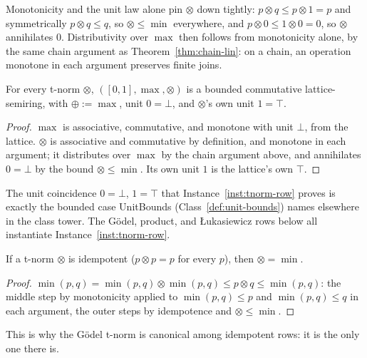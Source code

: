 Monotonicity and the unit law alone pin $\otimes$ down tightly: $p
\otimes q \le p \otimes 1 = p$ and symmetrically $p \otimes q \le q$, so
$\otimes \le \min$ everywhere, and $p \otimes 0 \le 1 \otimes 0 = 0$, so
$\otimes$ annihilates $0$. Distributivity over $\max$ then follows from
monotonicity alone, by the same chain argument as
Theorem~\ref{thm:chain-lin}: on a chain, an operation monotone in each
argument preserves finite joins.

\begin{instance}
\label{inst:tnorm-row}
\leanok
For every t-norm $\otimes$, $([0,1], \max, \otimes)$ is a bounded
commutative lattice-semiring, with $\oplus := \max$, unit $0 = \bot$,
and $\otimes$'s own unit $1 = \top$.
\end{instance}

\begin{proof}
\leanok
$\max$ is associative, commutative, and monotone with unit $\bot$, from
the lattice. $\otimes$ is associative and commutative by definition, and
monotone in each argument; it distributes over $\max$ by the chain
argument above, and annihilates $0=\bot$ by the bound $\otimes \le
\min$. Its own unit $1$ is the lattice's own $\top$.
\end{proof}

The unit coincidence $0=\bot$, $1=\top$ that Instance~\ref{inst:tnorm-row}
proves is exactly the bounded case UnitBounds (Class~\ref{def:unit-bounds})
names elsewhere in the class tower. The Gödel, product, and Łukasiewicz
rows below all instantiate Instance~\ref{inst:tnorm-row}.

\begin{lemma}
\label{lem:godel-unique-idempotent}
\leanok
If a t-norm $\otimes$ is idempotent ($p \otimes p = p$ for every $p$),
then $\otimes = \min$.
\end{lemma}

\begin{proof}
\leanok
$\min(p,q) = \min(p,q) \otimes \min(p,q) \le p \otimes q \le \min(p,q)$:
the middle step by monotonicity applied to $\min(p,q) \le p$ and
$\min(p,q) \le q$ in each argument, the outer steps by idempotence and
$\otimes \le \min$.
\end{proof}

This is why the Gödel t-norm is canonical among idempotent rows: it is
the only one there is.


